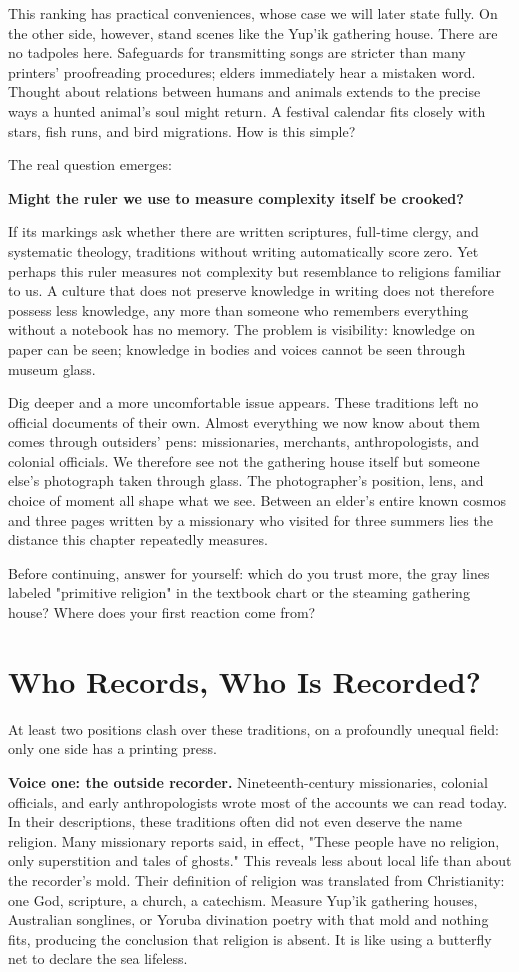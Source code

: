 This ranking has practical conveniences, whose case we will later state fully. On the other side, however, stand scenes like the Yup'ik gathering house. There are no tadpoles here. Safeguards for transmitting songs are stricter than many printers' proofreading procedures; elders immediately hear a mistaken word. Thought about relations between humans and animals extends to the precise ways a hunted animal's soul might return. A festival calendar fits closely with stars, fish runs, and bird migrations. How is this simple?

The real question emerges:

\textbf{Might the ruler we use to measure complexity itself be crooked?}

If its markings ask whether there are written scriptures, full-time clergy, and systematic theology, traditions without writing automatically score zero. Yet perhaps this ruler measures not complexity but resemblance to religions familiar to us. A culture that does not preserve knowledge in writing does not therefore possess less knowledge, any more than someone who remembers everything without a notebook has no memory. The problem is visibility: knowledge on paper can be seen; knowledge in bodies and voices cannot be seen through museum glass.

Dig deeper and a more uncomfortable issue appears. These traditions left no official documents of their own. Almost everything we now know about them comes through outsiders' pens: missionaries, merchants, anthropologists, and colonial officials. We therefore see not the gathering house itself but someone else's photograph taken through glass. The photographer's position, lens, and choice of moment all shape what we see. Between an elder's entire known cosmos and three pages written by a missionary who visited for three summers lies the distance this chapter repeatedly measures.

Before continuing, answer for yourself: which do you trust more, the gray lines labeled "primitive religion" in the textbook chart or the steaming gathering house? Where does your first reaction come from?

\section{Who Records, Who Is Recorded?}
At least two positions clash over these traditions, on a profoundly unequal field: only one side has a printing press.

\textbf{Voice one: the outside recorder.} Nineteenth-century missionaries, colonial officials, and early anthropologists wrote most of the accounts we can read today. In their descriptions, these traditions often did not even deserve the name religion. Many missionary reports said, in effect, "These people have no religion, only superstition and tales of ghosts." This reveals less about local life than about the recorder's mold. Their definition of religion was translated from Christianity: one God, scripture, a church, a catechism. Measure Yup'ik gathering houses, Australian songlines, or Yoruba divination poetry with that mold and nothing fits, producing the conclusion that religion is absent. It is like using a butterfly net to declare the sea lifeless.

